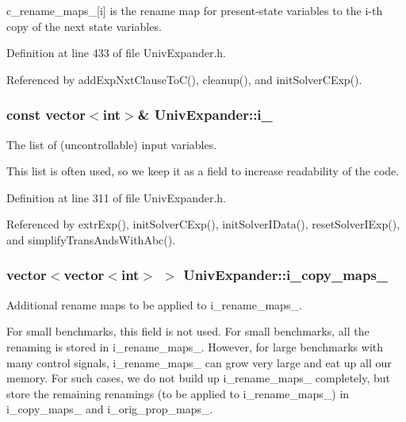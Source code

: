 c\-\_\-rename\-\_\-maps\-\_\-\mbox{[}i\mbox{]} is the rename map for present-\/state variables to the i-\/th copy of the next state variables. 

Definition at line 433 of file Univ\-Expander.\-h.



Referenced by add\-Exp\-Nxt\-Clause\-To\-C(), cleanup(), and init\-Solver\-C\-Exp().

\hypertarget{classUnivExpander_ab623917d2dd9530ca51b6952862f107c}{
\subsubsection[{i\-\_\-}]{\setlength{\rightskip}{0pt plus 5cm}const vector$<$int$>$\& Univ\-Expander\-::i\-\_\-\hspace{0.3cm}{\ttfamily [protected]}}}\label{classUnivExpander_ab623917d2dd9530ca51b6952862f107c}


The list of (uncontrollable) input variables. 

This list is often used, so we keep it as a field to increase readability of the code. 

Definition at line 311 of file Univ\-Expander.\-h.



Referenced by extr\-Exp(), init\-Solver\-C\-Exp(), init\-Solver\-I\-Data(), reset\-Solver\-I\-Exp(), and simplify\-Trans\-Ands\-With\-Abc().

\hypertarget{classUnivExpander_a7a67805b87282a1dcfcb25c33c04837d}{
\subsubsection[{i\-\_\-copy\-\_\-maps\-\_\-}]{\setlength{\rightskip}{0pt plus 5cm}vector$<$vector$<$int$>$ $>$ Univ\-Expander\-::i\-\_\-copy\-\_\-maps\-\_\-\hspace{0.3cm}{\ttfamily [protected]}}}\label{classUnivExpander_a7a67805b87282a1dcfcb25c33c04837d}


Additional rename maps to be applied to i\-\_\-rename\-\_\-maps\-\_\-. 

For small benchmarks, this field is not used. For small benchmarks, all the renaming is stored in i\-\_\-rename\-\_\-maps\-\_\-. However, for large benchmarks with many control signals, i\-\_\-rename\-\_\-maps\-\_\- can grow very large and eat up all our memory. For such cases, we do not build up i\-\_\-rename\-\_\-maps\-\_\- completely, but store the remaining renamings (to be applied to i\-\_\-rename\-\_\-maps\-\_\-) in i\-\_\-copy\-\_\-maps\-\_\- and i\-\_\-orig\-\_\-prop\-\_\-maps\-\_\-. 

